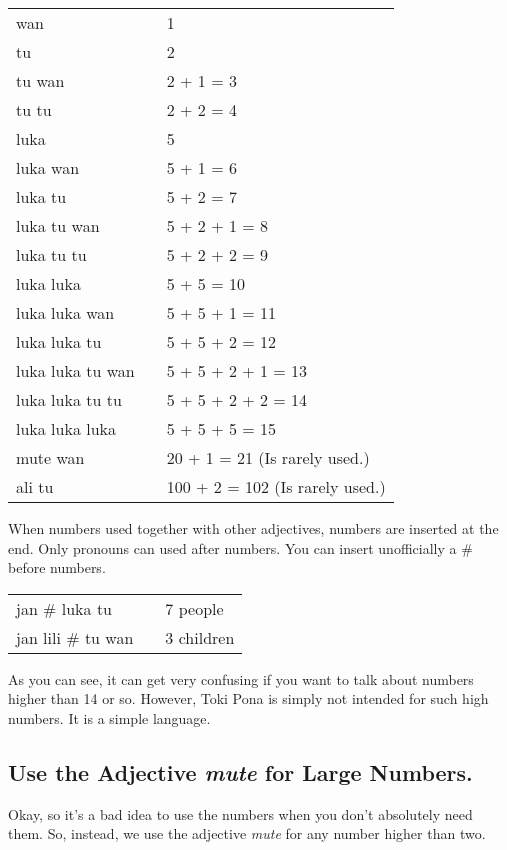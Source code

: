 \begin{supertabular}{p{5,5cm}|ll}
wan && 1 \\ 
tu  && 2 \\ 
tu wan && 2 + 1 = 3 \\
tu tu && 2 + 2 = 4 \\
luka && 5 \\
luka wan && 5 + 1 = 6 \\
luka tu && 5 + 2 = 7 \\
luka tu wan && 5 + 2 + 1 = 8 \\
luka tu tu && 5 + 2 + 2 = 9 \\
luka luka && 5 + 5 = 10 \\
luka luka wan && 5 + 5 + 1 = 11 \\
luka luka tu && 5 + 5 + 2 = 12 \\
luka luka tu wan && 5 + 5 + 2 + 1 = 13 \\
luka luka tu tu && 5 + 5 + 2 + 2 = 14 \\
luka luka luka && 5 + 5 + 5 = 15 \\
mute wan && 20 + 1 = 21 (Is rarely used.) \\
ali tu && 100 + 2 = 102 (Is rarely used.) \\
\end{supertabular} 

When numbers used together with other adjectives, numbers are inserted at the end.
Only pronouns can used after numbers.
You can insert unofficially a \# before numbers. 

\begin{supertabular}{p{5,5cm}|ll}
jan \# luka tu && 7 people \\
jan lili \# tu wan && 3 children \\
\end{supertabular} 

As you can see, it can get very confusing if you want to talk about numbers higher than 14 or so.
However, Toki Pona is simply not intended for such high numbers. 
It is a simple language. 
%
%
\subsection*{Use the Adjective \textit{mute} for Large Numbers.}
%
%
Okay, so it's a bad idea to use the numbers when you don't absolutely need them. 
So, instead, we use the adjective \textit{mute} for any number higher than two.

